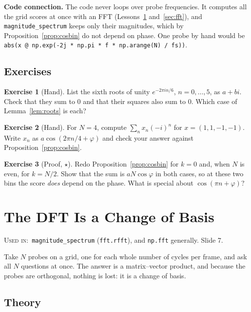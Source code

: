 \documentclass[11pt]{article}
\theoremstyle{definition}
\newtheorem{innerexercise}{Exercise}[section]
\newenvironment{exercise}[1][]{\begin{innerexercise}[#1]}{\end{innerexercise}}
\newcommand{\code}[1]{\texttt{#1}}
\newcommand{\usedin}[1]{\par\noindent\colorbox{black!8}{\parbox{\dimexpr\linewidth-2\fboxsep\relax}{\small\textsc{Used in:}~#1}}\par\medskip}
\begin{document}
\begin{connection}
\textbf{Code connection.} The code never loops over probe frequencies. It computes all
the grid scores at once with an FFT (Lessons~\ref{sec:dft} and~\ref{sec:fft}), and
\code{magnitude\_spectrum} keeps only their magnitudes, which by
Proposition~\ref{prop:cosbin} do not depend on phase. One probe by hand would be
\code{abs(x @ np.exp(-2j * np.pi * f * np.arange(N) / fs))}.
\end{connection}

\subsection{Exercises}
\begin{exercise}[Hand]\label{ex:sixth}
List the sixth roots of unity $e^{-2\pi in/6}$, $n=0,\dots,5$, as $a+bi$. Check that
they sum to 0 and that their squares also sum to 0. Which case of
Lemma~\ref{lem:roots} is each?
\end{exercise}

\begin{exercise}[Hand]\label{ex:probe4}
For $N=4$, compute $\sum_nx_n(-i)^n$ for $x=(1,1,-1,-1)$. Write $x_n$ as
$a\cos(2\pi n/4+\varphi)$ and check your answer against
Proposition~\ref{prop:cosbin}.
\end{exercise}

\begin{exercise}[Proof, $\star$]\label{ex:edgebins}
Redo Proposition~\ref{prop:cosbin} for $k=0$ and, when $N$ is even, for $k=N/2$. Show
that the sum is $aN\cos\varphi$ in both cases, so at these two bins the score
\emph{does} depend on the phase. What is special about $\cos(\pi n+\varphi)$?
\end{exercise}

\section{The DFT Is a Change of Basis}\label{sec:dft}
\usedin{\code{magnitude\_spectrum} (\code{fft.rfft}), and \code{np.fft} generally.
Slide 7.}

Take $N$ probes on a grid, one for each whole number of cycles per frame, and ask all
$N$ questions at once. The answer is a matrix--vector product, and because the probes
are orthogonal, nothing is lost: it is a change of basis.

\subsection{Theory}
\end{document}
